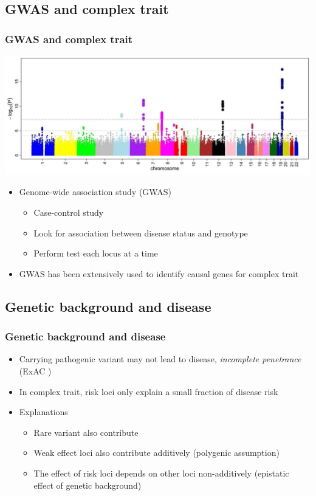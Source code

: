\documentclass{beamer}
\begin{document}
  \subsection{GWAS and complex trait}
  \begin{frame}
  \frametitle{GWAS and complex trait}
    \centering
    \includegraphics[width=0.8\linewidth]{gwas}
    \label{fig:gwas}
    \begin{itemize}
      \item Genome-wide association study (GWAS)
      \begin{itemize}
        \item Case-control study
        \item Look for association between disease status and genotype
        \item Perform test each locus at a time
      \end{itemize}
      \item GWAS has been extensively used to identify causal genes for complex trait
  \end{itemize}
  \end{frame}

  \subsection{Genetic background and disease}
  \begin{frame}
  \frametitle{Genetic background and disease}
    \begin{itemize}
      \item Carrying pathogenic variant may not lead to disease, \textit{incomplete penetrance} (ExAC \cite{lek2016analysis})
      \item In complex trait, risk loci only explain a small fraction of disease risk
      \item Explanations
        \begin{itemize}
          \item Rare variant also contribute
          \item Weak effect loci also contribute additively (polygenic assumption)
          \item The effect of risk loci depends on other loci non-additively (epistatic effect of genetic background)
        \end{itemize}
    \end{itemize}
  \end{frame}
\end{document}
